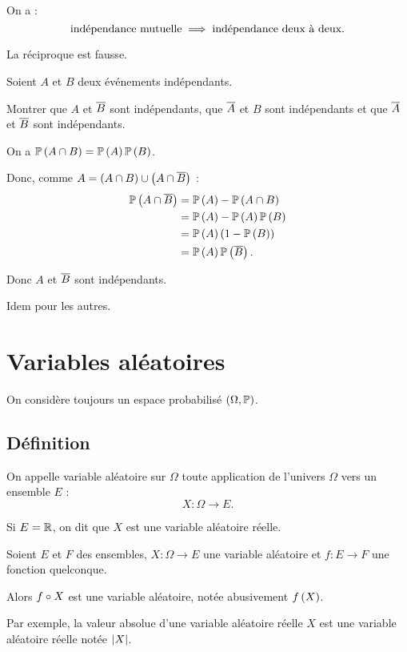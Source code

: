 \begin{rem}
On a : \[\text{indépendance mutuelle}\implies\text{indépendance deux à deux}.\]

La réciproque est fausse.
\end{rem}

\begin{exoex}
Soient \(A\) et \(B\) deux événements indépendants.

Montrer que \(A\) et \(\overline{B}\) sont indépendants, que \(\overline{A}\) et \(B\) sont indépendants et que \(\overline{A}\) et \(\overline{B}\) sont indépendants.
\end{exoex}

\begin{corr}
On a \(\mathbb{P}\left(A\cap B\right)=\mathbb{P}\left(A\right)\mathbb{P}\left(B\right)\).

Donc, comme \(A=\left(A\cap B\right)\cup\left(A\cap\overline{B}\right)\) : \[\begin{aligned}
\mathbb{P}\left(A\cap\overline{B}\right)&=\mathbb{P}\left(A\right)-\mathbb{P}\left(A\cap B\right) \\
&=\mathbb{P}\left(A\right)-\mathbb{P}\left(A\right)\mathbb{P}\left(B\right) \\
&=\mathbb{P}\left(A\right)\left(1-\mathbb{P}\left(B\right)\right) \\
&=\mathbb{P}\left(A\right)\mathbb{P}\left(\overline{B}\right).
\end{aligned}\]

Donc \(A\) et \(\overline{B}\) sont indépendants.

Idem pour les autres.
\end{corr}

\section{Variables aléatoires}

On considère toujours un espace probabilisé \(\groupe{\Omega}[\prem]\).

\subsection{Définition}

\begin{defi}
On appelle variable aléatoire sur \(\Omega\) toute application de l'univers \(\Omega\) vers un ensemble \(E\) : \[X:\Omega\to E.\]

Si \(E=\mathbb{R}\), on dit que \(X\) est une variable aléatoire réelle.
\end{defi}

\begin{nota}
Soient \(E\) et \(F\) des ensembles, \(X:\Omega\to E\) une variable aléatoire et \(f:E\to F\) une fonction quelconque.

Alors \(f\circ X\) est une variable aléatoire, notée abusivement \(f\left(X\right)\).

Par exemple, la valeur absolue d'une variable aléatoire réelle \(X\) est une variable aléatoire réelle notée \(\left\lvert X\right\rvert\).
\end{nota}

